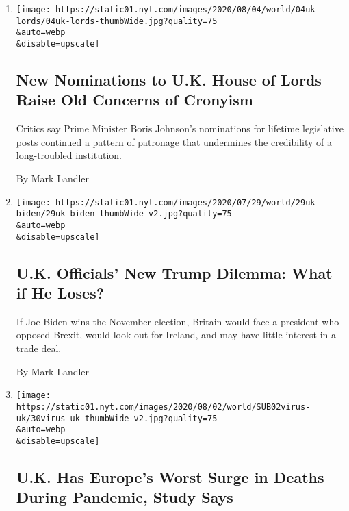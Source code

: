 \begin{enumerate}
\def\labelenumi{\arabic{enumi}.}
\item
  \href{/2020/08/04/world/house-of-lords-boris-johnson.html}{}

  \texttt{[image: https://static01.nyt.com/images/2020/08/04/world/04uk-lords/04uk-lords-thumbWide.jpg?quality=75\\\&auto=webp\\\&disable=upscale]}

  \hypertarget{new-nominations-to-uk-house-of-lords-raise-old-concerns-of-cronyism}{%
  \subsection{New Nominations to U.K. House of Lords Raise Old Concerns
  of
  Cronyism}\label{new-nominations-to-uk-house-of-lords-raise-old-concerns-of-cronyism}}

  Critics say Prime Minister Boris Johnson's nominations for lifetime
  legislative posts continued a pattern of patronage that undermines the
  credibility of a long-troubled institution.

  By Mark Landler
\item
  \href{/2020/07/31/world/europe/britain-biden-presidency-johnson.html}{}

  \texttt{[image: https://static01.nyt.com/images/2020/07/29/world/29uk-biden/29uk-biden-thumbWide-v2.jpg?quality=75\\\&auto=webp\\\&disable=upscale]}

  \hypertarget{uk-officials-new-trump-dilemma-what-if-he-loses}{%
  \subsection{U.K. Officials' New Trump Dilemma: What if He
  Loses?}\label{uk-officials-new-trump-dilemma-what-if-he-loses}}

  If Joe Biden wins the November election, Britain would face a
  president who opposed Brexit, would look out for Ireland, and may have
  little interest in a trade deal.

  By Mark Landler
\item
  \href{/2020/07/30/world/europe/UK-deaths-coronavirus-europe.html}{}

  \texttt{[image: https://static01.nyt.com/images/2020/08/02/world/SUB02virus-uk/30virus-uk-thumbWide-v2.jpg?quality=75\\\&auto=webp\\\&disable=upscale]}

  \hypertarget{uk-has-europes-worst-surge-in-deaths-during-pandemic-study-says}{%
  \subsection{U.K. Has Europe's Worst Surge in Deaths During Pandemic,
  Study
  Says}\label{uk-has-europes-worst-surge-in-deaths-during-pandemic-study-says}}


\end{enumerate}

